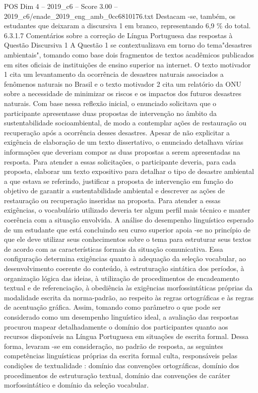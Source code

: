 \begin{textsample}{POS Dim 4 – 2019\_c6 – Score 3.00 – 2019\_c6/enade\_2019\_eng\_amb\_0cc6810176.txt}
Destacam -se, também, os estudantes que deixaram a discursiva 1 em branco, representando 6,9 \% do total. 6.3.1.7 Comentários sobre a correção de Língua Portuguesa das respostas à Questão Discursiva 1 A Questão 1 se contextualizava em torno do tema"desastres ambientais", tomando como base dois fragmentos de textos acadêmicos publicados em sites oficiais de instituições de ensino superior na internet.
O texto motivador 1 cita um levantamento da ocorrência de desastres naturais associados a fenômenos naturais no Brasil e o texto motivador 2 cita um relatório da ONU sobre a necessidade de minimizar os riscos e os impactos dos futuros desastres naturais.
Com base nessa reflexão inicial, o enunciado solicitava que o participante apresentasse duas propostas de intervenção no âmbito da sustentabilidade socioambiental, de modo a contemplar ações de restauração ou recuperação após a ocorrência desses desastres.
Apesar de não explicitar a exigência de elaboração de um texto dissertativo, o enunciado detalhava várias informações que deveriam compor as duas propostas a serem apresentadas na resposta.
Para atender a essas solicitações, o participante deveria, para cada proposta, elaborar um texto expositivo para detalhar o tipo de desastre ambiental a que estava se referindo, justificar a proposta de intervenção em função do objetivo de garantir a sustentabilidade ambiental e descrever as ações de restauração ou recuperação inseridas na proposta.
Para atender a essas exigências, o vocabulário utilizado deveria ter algum perfil mais técnico e manter coerência com a situação envolvida.
A análise do desempenho linguístico esperado de um estudante que está concluindo seu curso superior apoia -se no princípio de que ele deve utilizar seus conhecimentos sobre o tema para estruturar seus textos de acordo com as características formais da situação comunicativa.
Essa configuração determina exigências quanto à adequação da seleção vocabular, ao desenvolvimento coerente do conteúdo, à estruturação sintática dos períodos, à organização lógica das ideias, à utilização de procedimentos de encadeamento textual e de referenciação, à obediência às exigências morfossintáticas próprias da modalidade escrita da norma-padrão, ao respeito às regras ortográficas e às regras de acentuação gráfica.
Assim, tomando como parâmetro o que pode ser considerado como um desempenho linguístico ideal, a avaliação das respostas procurou mapear detalhadamente o domínio dos participantes quanto aos recursos disponíveis na Língua Portuguesa em situações de escrita formal.
Dessa forma, levaram -se em consideração, no padrão de resposta, as seguintes competências linguísticas próprias da escrita formal culta, responsáveis pelas condições de textualidade : domínio das convenções ortográficas, domínio dos procedimentos de estruturação textual, domínio das convenções de caráter morfossintático e domínio da seleção vocabular.

\end{textsample}
